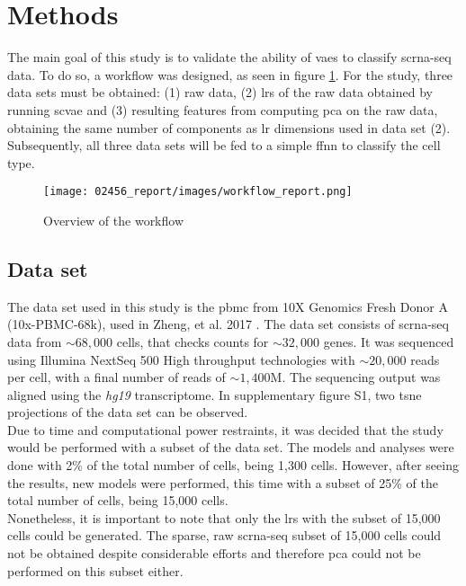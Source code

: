 \documentclass{article}
\begin{document}
\section{Methods}
\label{sec:methods}


\noindent The main goal of this study is to validate the ability of \glspl{vae} to classify \gls{scrna-seq} data. 
To do so, a workflow was designed, as seen in figure \ref{figure:overview}.
For the study, three data sets must be obtained: (1) raw data, (2) \glspl{lr} of the raw data obtained by running \gls{scvae} and (3) resulting features from computing \gls{pca} on the raw data, obtaining the same number of components as \gls{lr} dimensions used in data set (2).
Subsequently, all three data sets will be fed to a simple \gls{ffnn} to classify the cell type. \\

\begin{figure}[htp]
    \texttt{[image: 02456\_report/images/workflow\_report.png]}
    \caption{\small{Overview of the workflow}}
    \label{figure:overview}
\end{figure} 

\subsection{Data set}
\label{sec:dataset}

\noindent The data set used in this study is the \gls{pbmc} from 10X Genomics Fresh Donor A (10x-PBMC-68k), used in Zheng, et al. 2017 \cite{zheng2017a}. 
The data set consists of \gls{scrna-seq} data from $\sim 68,000$ cells, that checks counts for $\sim 32,000$ genes. 
It was sequenced using Illumina NextSeq 500 High throughput technologies with $\sim 20,000$ reads per cell, with a final number of reads of $\sim 1,400$M. 
The sequencing output was aligned using the \textit{hg19} transcriptome. 
In supplementary figure S1, two \gls{tsne} projections of the data set can be observed.\\ %

\noindent Due to time and computational power restraints, it was decided that the study would be performed with a subset of the data set. 
The models and analyses were done with 2\% of the total number of cells, being 1,300 cells. 
However, after seeing the results, new models were performed, this time with a subset of 25\% of the total number of cells, being 15,000 cells. \\
Nonetheless, it is important to note that only the \glspl{lr} with the subset of 15,000 cells could be generated. 
The sparse, raw \gls{scrna-seq} subset of 15,000 cells could not be obtained despite considerable efforts and therefore \gls{pca} could not be performed on this subset either.
\end{document}
